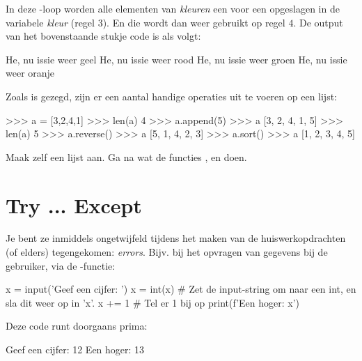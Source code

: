 In deze -loop worden alle elementen van \textit{kleuren} een voor een opgeslagen in de variabele \textit{kleur} (regel $3$). En die wordt dan weer gebruikt op regel $4$. De output van het bovenstaande stukje code is als volgt:

\begin{python}
He, nu issie weer geel
He, nu issie weer rood
He, nu issie weer groen
He, nu issie weer oranje
\end{python}

Zoals is gezegd, zijn er een aantal handige operaties uit te voeren op een lijst:
\begin{python}
>>> a = [3,2,4,1]
>>> len(a)
4
>>> a.append(5)
>>> a
[3, 2, 4, 1, 5]
>>> len(a)
5
>>> a.reverse()
>>> a
[5, 1, 4, 2, 3]
>>> a.sort()
>>> a
[1, 2, 3, 4, 5]
\end{python}

\begin{exercise}
Maak zelf een lijst aan. Ga na wat de functies ,  en  doen. 
\end{exercise}



\section{Try ... Except}
Je bent ze inmiddels ongetwijfeld tijdens het maken van de huiswerkopdrachten (of elders) tegengekomen: \textit{errors}. Bijv. bij het opvragen van gegevens bij de gebruiker, via de -functie:
\begin{python}
x = input('Geef een cijfer: ')
x = int(x)  # Zet de input-string om naar een int, en sla dit weer op in 'x'.
x += 1  # Tel er 1 bij op
print(f'Een hoger: {x}')
\end{python}
Deze code runt doorgaans prima:
\begin{python}
Geef een cijfer: 12
Een hoger: 13
\end{python}

\newpage 

